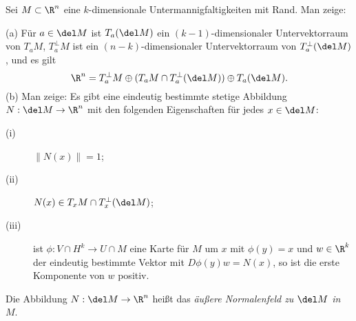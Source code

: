 \begin{prob}
%
Sei $M\subset\R^n$ eine $k$-dimensionale Untermannigfaltigkeiten mit Rand. Man zeige:

(a) F\"ur $a \in \del M$ ist $T_a(\del M)$ ein $(k-1)$-dimensionaler Untervektorraum von $T_a M$, $T_a^\perp M$ ist ein $(n-k)$-dimensionaler Untervektorraum von $T_a^\perp(\del M)$, und es gilt
$$
\R^n = T_a^\perp M \oplus (T_aM \cap T_a^\perp(\del M) ) \oplus T_a(\del M).
$$
(b) Man zeige: Es gibt eine eindeutig bestimmte stetige Abbildung $N:\del M\to\R^n$ mit den folgenden Eigenschaften f\"ur jedes $x \in \del M$:
\begin{description}%
	\item[(i)] $\|N(x)\|=1$;
	\item[(ii)] $N(x)\in T_xM\cap T_x^\perp(\del M)$;
	\item[(iii)] ist $\phi:V\cap H^k\to U\cap M$ eine Karte f\"ur $M$ um $x$ mit
	$\phi(y)=x$ und $w\in\R^k$ der eindeutig bestimmte Vektor mit
	$D\phi(y)w=N(x)$, so ist die erste Komponente von $w$ positiv. 
\end{description}
Die Abbildung $N:\del M\to\R^n$ hei\ss t das {\em \"au\ss ere Normalenfeld zu $\del M$ in $M$}. 
\vspace{2mm}
\end{prob}
